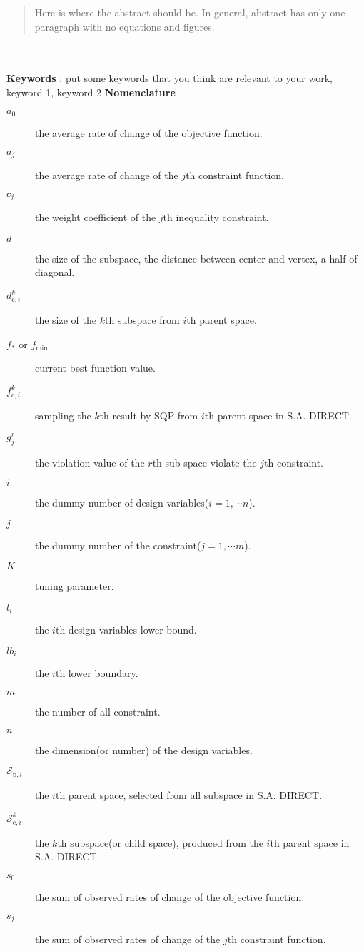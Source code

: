 \documentclass[a4paper,10pt]{article}
\begin{document}
\begin{abstract}
Here is where the abstract should be. In general, abstract has only one paragraph with no equations and figures. 
\end{abstract}
~\\~\\
\textbf{Keywords} : put some keywords that you think are relevant to your work, keyword 1, keyword 2\newpage
\noindent \textbf{Nomenclature}
\begin{description}
\item[$a_0$] the average rate of change of the objective function.
\item[$a_j$] the average rate of change of the $j$th constraint function.
\item[$c_j$] the weight coefficient of the $j$th inequality constraint.
\item[$d$] the size of the subspace, the distance between center and vertex, a half of diagonal.
\item[$d_{\mathrm{c},i}^{k}$] the size of the $k$th subspace from $i$th  parent space.
\item[$f_*$ or $f_{\mathrm{min}}$] current best function value.
\item[$f_{\mathrm{c},i}^{k}$] sampling the $k$th result by SQP from $i$th parent space in S.A. DIRECT.
\item[$g_j^r$] the violation value of the $r$th sub space violate the $j$th constraint.
\item[$i$] the dummy number of design variables($i=1,\cdots n$).
\item[$j$] the dummy number of the constraint($j=1,\cdots m$).
\item[$K$] tuning parameter.
\item[$l_i$] the $i$th design variables lower bound.
\item[$lb_i$] the $i$th lower boundary.
\item[$m$] the number of all constraint.
\item[$n$] the dimension(or number) of the design variables.
\item[$\mathcal{S}_{\mathrm{p}, i}$] the $i$th parent space, selected from all subspace in S.A. DIRECT.
\item[$\mathcal{S}_{\mathrm{c}, i}^k$] the $k$th subspace(or child space), produced from the $i$th parent space in S.A. DIRECT.
\item[$s_0$] the sum of observed rates of change of the objective function.
\item[$s_j$] the sum of observed rates of change of the $j$th constraint function.

\end{description}
\end{document}
